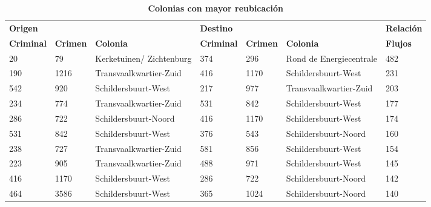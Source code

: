 \begin{table}[H]
\centering
\caption{\textbf{Colonias con mayor reubicaci\'on}}
\scriptsize
\label{top10_fcc}
\begin{tabular}{p{.6cm} p{.5cm} p{1.5cm}| p{.6cm} p{.5cm} p{1.5cm} |p{.8cm}} 
\multicolumn{3}{l}{\textbf{Origen}}                    & \multicolumn{3}{l}{\textbf{Destino}}                   & \textbf{Relaci\'on} \\
\textbf{Criminal} & \textbf{Crimen} & \textbf{Colonia}                 & \textbf{Criminal} & \textbf{Crimen} & \textbf{Colonia}                 & \textbf{Flujos }  \\
\hline
\hline
20         & 79     & Kerketuinen/ Zichtenburg & 374        & 296    & Rond de Energiecentrale & 482      \\
190        & 1216   & Transvaalkwartier-Zuid  & 416        & 1170   & Schildersbuurt-West     & 231      \\
542        & 920    & Schildersbuurt-West     & 217        & 977    & Transvaalkwartier-Zuid  & 203      \\
234        & 774    & Transvaalkwartier-Zuid  & 531        & 842    & Schildersbuurt-West     & 177      \\
286        & 722    & Schildersbuurt-Noord    & 416        & 1170   & Schildersbuurt-West     & 174      \\
531        & 842    & Schildersbuurt-West     & 376        & 543    & Schildersbuurt-Noord    & 160      \\
238        & 727    & Transvaalkwartier-Zuid  & 581        & 856    & Schildersbuurt-West     & 154      \\
223        & 905    & Transvaalkwartier-Zuid  & 488        & 971    & Schildersbuurt-West     & 145      \\
416        & 1170   & Schildersbuurt-West     & 286        & 722    & Schildersbuurt-Noord    & 142      \\
464        & 3586   & Schildersbuurt-West     & 365        & 1024   & Schildersbuurt-Noord    & 140     
\end{tabular}
\end{table}